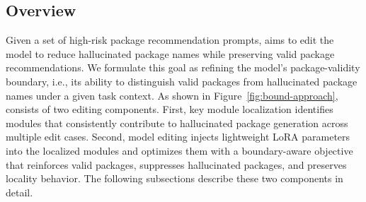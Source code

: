 \subsection{Overview}
Given a set of high-risk package recommendation prompts, \appname aims to edit the model to reduce hallucinated package names while preserving valid package recommendations. 
We formulate this goal as refining the model's package-validity boundary, i.e., its ability to distinguish valid packages from hallucinated package names under a given task context.
As shown in Figure~\ref{fig:bound-approach}, \appname consists of two editing components. First, key module localization identifies modules that consistently contribute to hallucinated package generation across multiple edit cases. Second, model editing injects lightweight LoRA parameters into the localized modules and optimizes them with a boundary-aware objective that reinforces valid packages, suppresses hallucinated packages, and preserves locality behavior. The following subsections describe these two components in detail.



